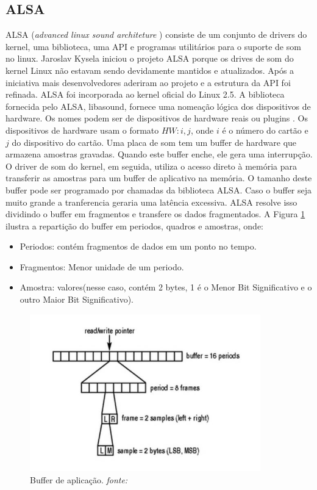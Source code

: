 \subsection{ALSA}
\quad ALSA (\textit{advanced linux sound architeture }) consiste de um conjunto de drivers do kernel, uma biblioteca, uma API e programas utilitários para o suporte de som no linux. Jaroslav Kysela iniciou o projeto ALSA porque os drives de som do kernel Linux não estavam sendo devidamente mantidos e atualizados. Após  a iniciativa mais desenvolvedores aderiram ao projeto e a estrutura da API foi refinada. ALSA foi incorporada ao kernel oficial do Linux 2.5.
A biblioteca fornecida pelo ALSA, libasound, fornece uma nomeação lógica dos dispositivos de hardware. Os nomes podem ser de dispositivos de hardware reais ou plugins \cite{linux}. Os dispositivos de hardware usam o formato $HW:i,j$, onde $i$ é o número do cartão e $j$ do dispositivo do cartão. Uma placa de som tem um buffer de hardware que armazena amostras gravadas. Quando este buffer enche, ele gera uma interrupção. O driver de som do kernel, em seguida, utiliza o acesso direto à memória  para transferir as amostras para um buffer de aplicativo na memória. O tamanho deste buffer pode ser  programado por chamadas da biblioteca ALSA. Caso o buffer seja muito grande a tranferencia geraria uma latência excessiva. ALSA resolve isso dividindo o buffer em fragmentos e transfere os dados fragmentados. A Figura \ref{fig:pcm} ilustra a repartição do buffer em periodos, quadros e amostras, onde: 
\begin{itemize}
\item Periodos: contém fragmentos de dados em um ponto no tempo.
\item Fragmentos: Menor unidade de um periodo.
\item Amostra: valores(nesse caso,  contém 2 bytes, 1 é o Menor Bit Significativo e o outro Maior Bit Significativo).
\end{itemize}
\begin{figure}[H]
\centering %
\includegraphics[width=10cm]{img/pcm.jpg} %
\caption{Buffer de aplicação. \textit{fonte:\cite{linux}}}
\label{fig:pcm}
\end{figure}

